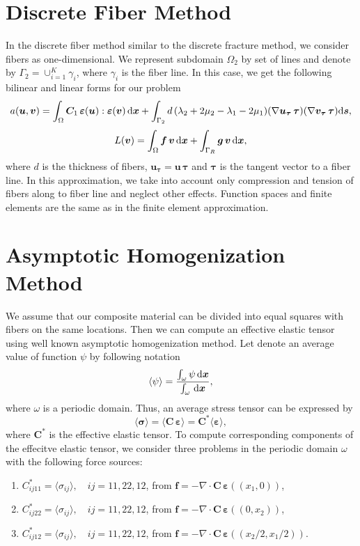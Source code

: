 \documentclass[a4paper]{jpconf}
\begin{document}
\section{Discrete Fiber Method}

In the discrete fiber method similar to the discrete fracture method, we consider fibers as one-dimensional. We represent subdomain $\Omega_2$ by set of lines and denote by $\Gamma_2=\cup_{i=1}^K \gamma_i$, where $\gamma_i$ is the fiber line.
In this case, we get the following bilinear and linear forms for our problem
\[
a(\bm{u}, \bm{v}) = \int_\Omega \bm{C}_1\, \bm{\varepsilon}(\bm{u}) : \bm\varepsilon(\bm{v})\, {\rm d}\bm{x}
+ \int_{\Gamma_{2}} d\, (\lambda_2 + 2\mu_2 - \lambda_1 - 2\mu_1) (\nabla \bm{u}_{\bm{\tau}}\, {\bm{\tau}})(\nabla \bm{v}_{\bm{\tau}}\, {\bm{\tau}}) {\rm d}\bm{s},
\]
\[
L(\bm v) = \int_{\Omega}\bm{f}\, \bm{v}\, {\rm d}\bm{x} +\int_{\Gamma_R}\bm{g}\, \bm{v}\, {\rm{d}}\bm{x},
\]
where $d$ is the thickness of fibers, $\bm{u}_{\bm{\tau}} = \bm{u}\, \bm{\tau}$ and $\bm{\tau}$ is the tangent vector to a fiber line. 
In this approximation, we take into account only compression and tension of fibers along to fiber line and neglect other effects. Function spaces and finite elements are the same as in the finite element approximation.

\section{Asymptotic Homogenization Method}
We assume that our composite material can be divided into equal squares with fibers on the same locations. Then we can compute an effective elastic tensor using well known asymptotic homogenization method. Let denote an average value of function $\psi$ by following notation
\[
\langle\psi\rangle = \frac{\int_\omega \psi \, {\rm d}\bm{x}}{\int_\omega \, {\rm d}\bm{x}},
\]
where $\omega$ is a periodic domain.
Thus, an average stress tensor can be expressed by
\[
\langle \bm{\sigma} \rangle = \langle \bm{C}\, \bm{\varepsilon} \rangle = \bm{C^*} \langle \bm{\varepsilon}\rangle,
\]
where $\bm{C^*}$ is the effective elastic tensor. To compute corresponding components of the effecitve elastic tensor, we consider three problems in the periodic domain $\omega$ with the following force sources:
\begin{enumerate}
\item $C^*_{ij11} = \langle \sigma_{ij} \rangle, \quad ij=11, 22, 12$, from $\bm{f} = -\nabla \cdot \bm{C}\, \bm{\varepsilon}((x_1, 0))$,
\item $C^*_{ij22} = \langle \sigma_{ij} \rangle, \quad ij=11, 22, 12$, from $\bm{f} = -\nabla \cdot \bm{C}\, \bm{\varepsilon}((0, x_2))$,
\item $C^*_{ij12} = \langle \sigma_{ij} \rangle, \quad ij=11, 22, 12$, from $\bm{f} = -\nabla \cdot \bm{C}\, \bm{\varepsilon}((x_2/2, x_1/2))$.
\end{enumerate}
\end{document}

